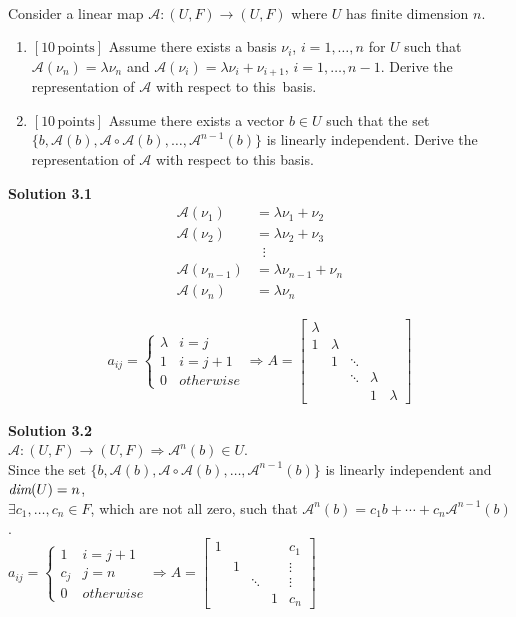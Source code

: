 \documentclass[a4paper,10.5pt]{article}
\def\dim{{\mbox{\em dim}}}
\newcommand{\A}{\mathcal{A}}
\begin{document}
\\
Consider a linear map $\A:(U,F) \rightarrow (U,F)$
where $U$ has finite dimension $n$. 
\begin{enumerate}
	\item {\bf$[10\, \text{points}]$} Assume there exists a basis
	$\nu_i$, $i=1, \ldots, n$ for $U$ such that ${\mathcal A}(\nu_n)=\lambda
	\nu_n$ and ${\mathcal A}(\nu_i)=\lambda \nu_i+\nu_{i+1}$, $i=1, \ldots,
	n-1$. Derive the representation of ${\mathcal A}$ with respect to this~basis.
	\item {\bf$[10\, \text{points}]$} Assume there exists a vector $b
	\in U$ such that the set $\{b, {\mathcal A}(b), {\mathcal
		A}\circ {\mathcal A}(b), \ldots, {\mathcal A}^{n-1}(b)\}$ is linearly independent. Derive the representation of ${\mathcal A}$
	with respect to this basis.\\
\end{enumerate}

{\bf Solution 3.1} \\
\begin{align*}
\A(\nu_1) &= \lambda \nu_1 + \nu_2 \\
\A(\nu_2) &= \lambda \nu_2 + \nu_3 \\
		  &\; \; \vdots \\
\A(\nu_{n-1}) &= \lambda \nu_{n-1} + \nu_n \\
\A(\nu_n) &= \lambda \nu_n
\end{align*}

\begin{align*}
a_{ij} = \begin{cases}
\lambda & i = j \\
1 & i = j + 1 \\
0 & otherwise
\end{cases} \Rightarrow A = \left[\begin{matrix}
\lambda & & & & \\
1 & \lambda & & & \\
& 1 & \ddots & & \\
& & \ddots & \lambda & \\
& & & 1 & \lambda
\end{matrix}\right]
\end{align*}


{\bf Solution 3.2} \\

$\A:(U,F) \rightarrow (U,F) \Rightarrow \A^n(b) \in U$. \\
Since the set $\{b, {\A}(b), {\A} \circ {\A}(b), \ldots, {\A}^{n-1}(b)\}$ is linearly independent and $\dim(U) = n$, \\
$\exists c_1,\dots,c_n \in F$, which are not all zero, such that $\A^n(b) = c_1b + \cdots + c_n\A^{n-1}(b)$. \\

$a_{ij} = \begin{cases}
1 & i = j + 1 \\
c_j & j = n \\
0 & otherwise
\end{cases} \Rightarrow A = \left[\begin{matrix}
1 & & & & c_1\\
& 1 & & & \vdots \\
&  & \ddots & & \vdots\\
& &  & 1 & c_n
\end{matrix}\right]$
\end{document}
